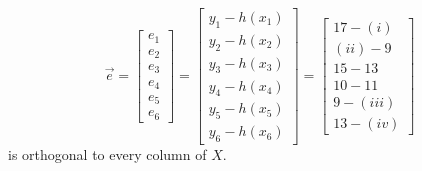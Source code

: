 \documentclass[11pt]{article}
\begin{document}
\begin{prob}
\begin{solution}
$$\vec e = \begin{bmatrix} e_1 \\ e_2 \\ e_3 \\ e_4 \\ e_5 \\ e_6 \end{bmatrix} = \begin{bmatrix} y_1 - h(x_1) \\ y_2 - h(x_2) \\ y_3 - h(x_3) \\ y_4 - h(x_4) \\ y_5 - h(x_5) \\ y_6 - h(x_6) \end{bmatrix} = \begin{bmatrix} 17 - (i) \\ (ii) - 9 \\ 15 - 13 \\ 10 - 11 \\ 9 - (iii) \\ 13 - (iv) \end{bmatrix}$$ is orthogonal to every column of $X$. \\


\end{solution}
\end{prob}
\end{document}
